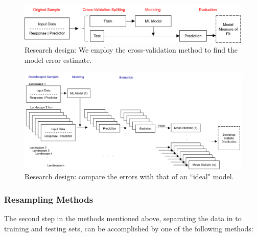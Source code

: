 \begin{figure}[ht]
	\centering
	\includegraphics[width=15cm,trim={0 0 0 0},clip=true]{plots/cv_flowchart.png}
	\caption{Research design: We employ the cross-validation method to find the model error estimate.} 
	\label{fig:cvmethods}
\end{figure}

\begin{figure}[ht]
	\centering
	\includegraphics[width=15cm,trim={0 0 0 0},clip=true]{plots/ideal_flowchart.png}
	\caption{Research design: compare the errors with that of an ``ideal" model.} 
	\label{fig:idealmethod}
\end{figure}

\subsubsection*{Resampling Methods} \label{ch5:resamp}
The second step in the methods mentioned above, separating the data in to training and testing sets, can be accomplished by one of the following methods: 

